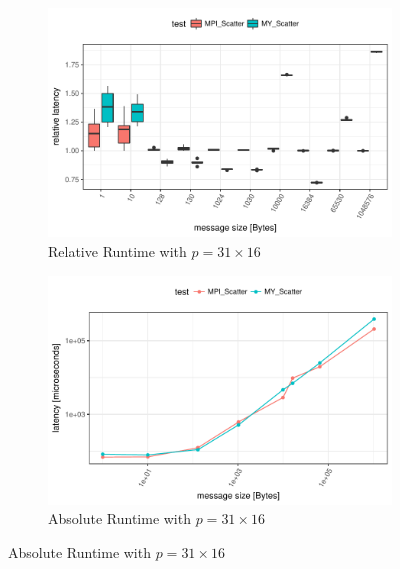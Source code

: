 \begin{figure}[h]
    \centering
    
    \begin{subfigure}[b]{0.49\textwidth}
        \includegraphics[width=\textwidth]{../benchmarks/openmpi/divide_conquer/scatter_31/rel_runtime.pdf}
        \caption{Relative Runtime with $p=31 \times 16$}
        \label{fig:Scatter:OpenMPI:Rel:31}
    \end{subfigure}
    \begin{subfigure}[b]{0.49\textwidth}
        \includegraphics[width=\textwidth]{../benchmarks/openmpi/divide_conquer/scatter_31/runtime.pdf}
        \caption{Absolute Runtime with $p=31 \times 16$}
        \label{fig:Scatter:OpenMPI:Abs:31}
    \end{subfigure}
    

\end{figure}
